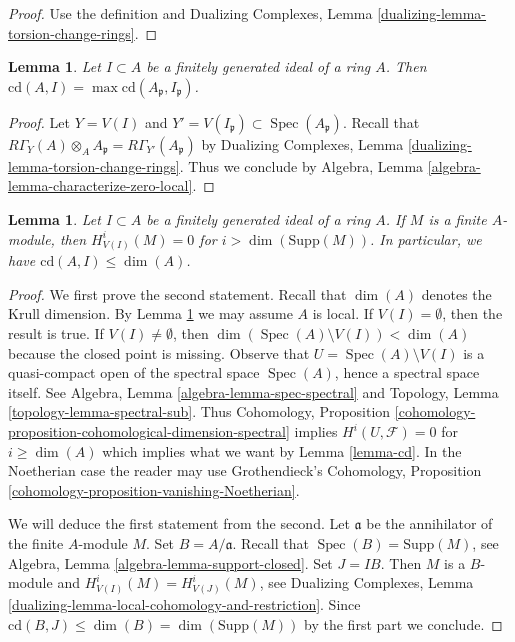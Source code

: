 \documentclass{stacks-project}
\theoremstyle{plain}
\newtheorem{lemma}[subsection]{Lemma}
\theoremstyle{definition}
\theoremstyle{remark}
\numberwithin{equation}{subsection}
\def\Spec{\mathop{\mathrm{Spec}}}
\begin{document}
\begin{proof}
Use the definition and
Dualizing Complexes, Lemma \ref{dualizing-lemma-torsion-change-rings}.
\end{proof}

\begin{lemma}
\label{lemma-cd-local}
Let $I \subset A$ be a finitely generated ideal of a ring $A$.
Then $\text{cd}(A, I) = \max \text{cd}(A_\mathfrak p, I_\mathfrak p)$.
\end{lemma}

\begin{proof}
Let $Y = V(I)$ and $Y' = V(I_\mathfrak p) \subset \Spec(A_\mathfrak p)$.
Recall that
$R\Gamma_Y(A) \otimes_A A_\mathfrak p = R\Gamma_{Y'}(A_\mathfrak p)$
by Dualizing Complexes, Lemma \ref{dualizing-lemma-torsion-change-rings}.
Thus we conclude by Algebra, Lemma \ref{algebra-lemma-characterize-zero-local}.
\end{proof}

\begin{lemma}
\label{lemma-cd-dimension}
Let $I \subset A$ be a finitely generated ideal of a ring $A$.
If $M$ is a finite $A$-module, then
$H^i_{V(I)}(M) = 0$ for $i > \dim(\text{Supp}(M))$.
In particular, we have $\text{cd}(A, I) \leq \dim(A)$.
\end{lemma}

\begin{proof}
We first prove the second statement.
Recall that $\dim(A)$ denotes the Krull dimension. By
Lemma \ref{lemma-cd-local} we may assume $A$ is local.
If $V(I) = \emptyset$, then the result is true.
If $V(I) \not = \emptyset$, then
$\dim(\Spec(A) \setminus V(I)) < \dim(A)$ because
the closed point is missing. Observe that
$U = \Spec(A) \setminus V(I)$ is a quasi-compact
open of the spectral space $\Spec(A)$, hence a spectral space itself.
See Algebra, Lemma \ref{algebra-lemma-spec-spectral} and
Topology, Lemma \ref{topology-lemma-spectral-sub}.
Thus Cohomology, Proposition
\ref{cohomology-proposition-cohomological-dimension-spectral}
implies $H^i(U, \mathcal{F}) = 0$ for $i \geq \dim(A)$
which implies what we want by Lemma \ref{lemma-cd}.
In the Noetherian case the reader may use
Grothendieck's Cohomology, Proposition
\ref{cohomology-proposition-vanishing-Noetherian}.

\medskip\noindent
We will deduce the first statement from the second.
Let $\mathfrak a$ be the annihilator of the finite $A$-module $M$.
Set $B = A/\mathfrak a$. Recall that $\Spec(B) = \text{Supp}(M)$, see
Algebra, Lemma \ref{algebra-lemma-support-closed}.
Set $J = IB$. Then $M$ is a $B$-module
and $H^i_{V(I)}(M) = H^i_{V(J)}(M)$, see
Dualizing Complexes, Lemma
\ref{dualizing-lemma-local-cohomology-and-restriction}.
Since $\text{cd}(B, J) \leq \dim(B) = \dim(\text{Supp}(M))$
by the first part we conclude.
\end{proof}
\end{document}
